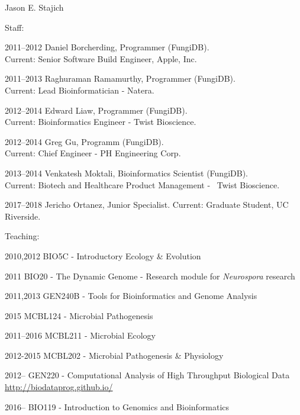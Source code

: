 \documentclass[10pt]{article}
\begin{document}
\begin{cv}{\centerline{Jason E. Stajich}}
\begin{cvlistcompact}{Staff:}
\item [2011--2012] Daniel Borcherding, Programmer (FungiDB). \\ Current: Senior Software Build Engineer, Apple, Inc.
\item [2011--2013] Raghuraman Ramamurthy, Programmer (FungiDB). \\ Current: Lead Bioinformatician - Natera.
\item [2012--2014] Edward Liaw, Programmer (FungiDB). \\ Current: Bioinformatics Engineer - Twist Bioscience.
\item [2012--2014] Greg Gu, Programm (FungiDB). \\ Current: Chief Engineer - PH Engineering Corp.
\item [2013--2014] Venkatesh Moktali, Bioinformatics Scientist (FungiDB). \\ Current: Biotech and Healthcare Product Management -  Twist Bioscience.
\item [2017--2018] Jericho Ortanez, Junior Specialist. Current: Graduate Student, UC Riverside.
\end{cvlistcompact}

\begin{cvlistcompact}{Teaching:}
\item [2010,2012] BIO5C - Introductory Ecology \& Evolution
\item [2011] BIO20 - The Dynamic Genome - Research module for \textit{Neurospora} research
\item [2011,2013] GEN240B - Tools for Bioinformatics and Genome Analysis
\item [2015] MCBL124 - Microbial Pathogenesis
\item [2011--2016] MCBL211 - Microbial Ecology
\item [2012-2015] MCBL202 - Microbial Pathogenesis \& Physiology
\item [2012--] GEN220 - Computational Analysis of High Throughput Biological Data \url{http://biodataprog.github.io/}
\item [2016--] BIO119 - Introduction to Genomics and Bioinformatics

\end{cvlistcompact}


\end{cv}
\end{document}
